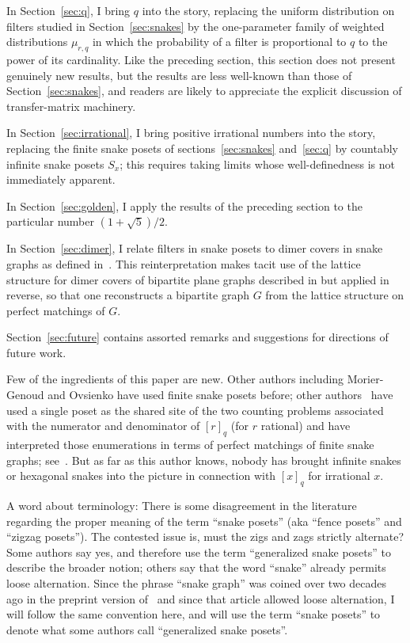 \documentclass[12pt]{article}
\theoremstyle{plain}
\theoremstyle{definition}
\theoremstyle{remark}
\begin{document}
In Section~\ref{sec:q}, I bring $q$ into the story,
replacing the uniform distribution on filters 
studied in Section~\ref{sec:snakes}
by the one-parameter family of weighted distributions $\mu_{r,q}$ 
in which the probability of a filter is proportional to
$q$ to the power of its cardinality.
Like the preceding section,
this section does not present genuinely new results,
but the results are less well-known than
those of Section~\ref{sec:snakes},
and readers are likely to appreciate
the explicit discussion of transfer-matrix machinery.

In Section~\ref{sec:irrational}, I bring positive irrational numbers 
into the story, replacing the finite snake posets 
of sections~\ref{sec:snakes} and~\ref{sec:q}
by countably infinite snake posets $S_x$;
this requires taking limits whose well-definedness is not immediately apparent.

In Section~\ref{sec:golden}, I apply the results of the preceding section
to the particular number $(1+\sqrt{5})/2$.

In Section~\ref{sec:dimer}, I relate filters in snake posets
to dimer covers in snake graphs as defined in~\cite{P20}.
This reinterpretation makes tacit use of 
the lattice structure for dimer covers 
of bipartite plane graphs described in \cite{P25}
but applied in reverse, so that one reconstructs a bipartite graph $G$
from the lattice structure on perfect matchings of $G$.

Section~\ref{sec:future} contains assorted remarks and suggestions
for directions of future work.

Few of the ingredients of this paper are new.
Other authors including Morier-Genoud and Ovsienko
have used finite snake posets before;
other authors~\cite{AL25} have used a single poset 
as the shared site of the two counting problems
associated with the numerator and denominator of $[r]_q$
(for $r$ rational) and have interpreted those enumerations
in terms of perfect matchings of finite snake graphs; see~\cite{O25}.
But as far as this author knows,
nobody has brought infinite snakes or hexagonal snakes into the picture
in connection with $[x]_q$ for irrational $x$.

A word about terminology: There is some disagreement in the literature 
regarding the proper meaning of the term 
``snake posets'' (aka ``fence posets'' and ``zigzag posets''). 
The contested issue is, must the zigs and zags strictly alternate?
Some authors say yes, and therefore use the term 
``generalized snake posets'' to describe the broader notion; 
others say that the word ``snake'' already permits loose alternation.
Since the phrase ``snake graph'' was coined over two decades ago
in the preprint version of~\cite{P20} and 
since that article allowed loose alternation, 
I will follow the same convention here,
and will use the term ``snake posets'' to denote
what some authors call ``generalized snake posets''.
\end{document}
